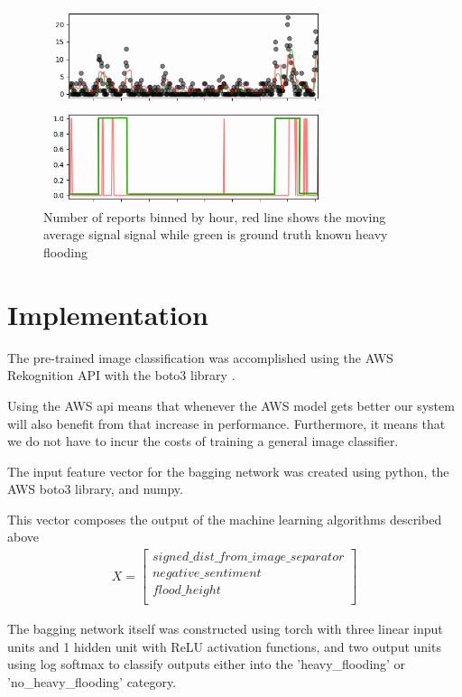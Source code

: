 \begin{figure}[ht]
    \includegraphics[width = 85mm]{moving_avg_jakarta.png}
    \caption{Number of reports binned by hour, red line shows the moving average signal signal while 
    green is ground truth known heavy flooding}
    \label{fig:moving_avg}
\end{figure}

\section{Implementation}
The pre-trained image classification was accomplished 
using the AWS Rekognition API with the boto3 library 
\cite{boto}.

Using the AWS api means that whenever the AWS model 
gets better our system will also benefit from that
increase in performance. Furthermore, it means
that we do not have to incur the costs of training a
general image classifier.

The input feature vector for the 
bagging network was created using python, the AWS boto3 library, and numpy.

This vector composes the output of the machine learning algorithms described
above
\\

\begin{align}
    X = \begin{bmatrix}
           signed\_dist\_from\_image\_separator \\
           negative\_sentiment \\
           flood\_height \\
         \end{bmatrix}
\end{align}

The bagging network itself was constructed using torch with three linear input
units and 1 hidden unit with ReLU activation functions, and two output units 
using log softmax to classify outputs either into the 'heavy\_flooding' or 
'no\_heavy\_flooding' category.

